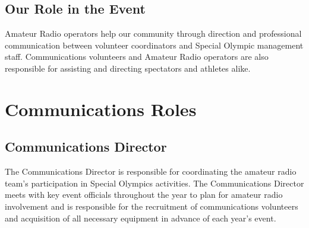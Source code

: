 \documentclass[pdflatex,letterpaper,twoside,12pt]{book}
\begin{document}

\section{Our Role in the Event}

Amateur Radio operators help our community through direction and professional communication between volunteer coordinators and Special Olympic management staff.  Communications volunteers and Amateur Radio operators are also responsible for assisting and directing spectators and athletes alike.




\chapter{Communications Roles}


\section{Communications Director}

The Communications Director is responsible for coordinating the amateur radio team's participation in Special Olympics activities.  The Communications Director meets with key event officials throughout the year to plan for amateur radio involvement and is responsible for the recruitment of communications volunteers and acquisition of all necessary equipment in advance of each year's event.
\end{document}
